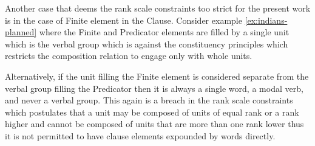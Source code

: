 \begin{table}[!ht]
    \centering
    \caption{Sydney grammar Mood analysis of Example \ref{ex:indians-planned}}
    \label{tab:indians-planned-sydney}
\end{table}

Another case that deems the rank scale constraints too strict for the present work is in the case of Finite element in the Clause. Consider example \ref{ex:indians-planned} where the Finite and Predicator elements are filled by a single unit which is the verbal group which is against the constituency principles which restricts the composition relation to engage only with whole units. 

Alternatively, if the unit filling the Finite element is considered separate from the verbal group filling the Predicator then it is always a single word, a modal verb, and never a verbal group. This again is a breach in the rank scale constraints which postulates that a unit may be composed of units of equal rank or a rank higher and cannot be composed of units that are more than one rank lower thus it is not permitted to have clause elements expounded by words directly. 

